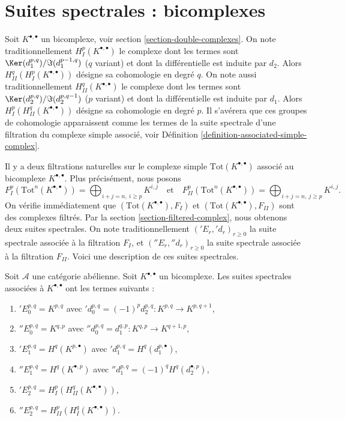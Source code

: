 \section{Suites spectrales : bicomplexes}
\label{section-double-complex}

\noindent
Soit $K^{\bullet, \bullet}$ un bicomplexe, voir
section \ref{section-double-complexes}. On note traditionnellement
$H^p_I(K^{\bullet, \bullet})$
le complexe dont les termes sont $\Ker(d_1^{p, q})/\Im(d_1^{p - 1, q})$
($q$ variant) et dont la différentielle est induite par $d_2$.
Alors $H^q_{II}(H^p_I(K^{\bullet, \bullet}))$ désigne sa cohomologie en
degré $q$. On note aussi traditionnellement $H^q_{II}(K^{\bullet, \bullet})$
le complexe dont les termes sont $\Ker(d_2^{p, q})/\Im(d_2^{p, q - 1})$
($p$ variant) et dont la différentielle est induite par $d_1$.
Alors $H^p_I(H^q_{II}(K^{\bullet, \bullet}))$ désigne sa cohomologie en
degré $p$. Il s'avérera que ces groupes de cohomologie apparaissent
comme les termes de la suite spectrale d'une filtration du
complexe simple associé, voir
Définition \ref{definition-associated-simple-complex}.

\medskip\noindent
Il y a deux filtrations naturelles sur le complexe simple
$\text{Tot}(K^{\bullet, \bullet})$
associé au bicomplexe $K^{\bullet, \bullet}$. Plus précisément, nous
posons
$$
F_I^p(\text{Tot}^n(K^{\bullet, \bullet})) =
\bigoplus\nolimits_{i + j = n, \ i \geq p} K^{i, j}
\quad
\text{et}
\quad
F_{II}^p(\text{Tot}^n(K^{\bullet, \bullet})) =
\bigoplus\nolimits_{i + j = n, \ j \geq p} K^{i, j}.
$$
On vérifie immédiatement que $(\text{Tot}(K^{\bullet, \bullet}), F_I)$ et
$(\text{Tot}(K^{\bullet, \bullet}), F_{II})$ sont des complexes filtrés.
Par la section \ref{section-filtered-complex},
nous obtenons deux suites spectrales. On note traditionnellement
$({}'E_r, {}'d_r)_{r \geq 0}$ la suite spectrale associée
à la filtration $F_I$, et $({}''E_r, {}''d_r)_{r \geq 0}$
la suite spectrale associée à la filtration $F_{II}$.
Voici une description de ces suites spectrales.

\begin{lemma}
\label{lemma-ss-double-complex}
Soit $\mathcal{A}$ une catégorie abélienne.
Soit $K^{\bullet, \bullet}$ un bicomplexe.
Les suites spectrales associées à $K^{\bullet, \bullet}$
ont les termes suivants :
\begin{enumerate}
\item ${}'E_0^{p, q} = K^{p, q}$ avec
${}'d_0^{p, q} = (-1)^p d_2^{p, q} : K^{p, q} \to K^{p, q + 1}$,
\item ${}''E_0^{p, q} = K^{q, p}$ avec
${}''d_0^{p, q} = d_1^{q, p} : K^{q, p} \to K^{q + 1, p}$,
\item ${}'E_1^{p, q} = H^q(K^{p, \bullet})$ avec
${}'d_1^{p, q} = H^q(d_1^{p, \bullet})$,
\item ${}''E_1^{p, q} = H^q(K^{\bullet, p})$ avec
${}''d_1^{p, q} = (-1)^q H^q(d_2^{\bullet, p})$,
\item ${}'E_2^{p, q} = H^p_I(H^q_{II}(K^{\bullet, \bullet}))$,
\item ${}''E_2^{p, q} = H^p_{II}(H^q_I(K^{\bullet, \bullet}))$.
\end{enumerate}
\end{lemma}

